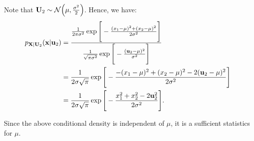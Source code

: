 \begin{example}
\begin{enumerate}[label=(\roman*)]
        \noindent Note that ${\bf U}_2 \sim \mathcal{N}\Big( \mu, \frac{\sigma^2}{2} \Big)$. Hence, we have:
        \begin{align*}
             p_{{\bf X}|{\bf U}_2}({\bf x}|{\bf u}_2) &= \frac{
                \frac{1}{2\pi\sigma^2}\exp\Bigg[ -\frac{(x_1 - \mu)^2 + (x_2 - \mu)^2}{2\sigma^2} \Bigg]
             }{
                \frac{1}{\sqrt{\pi\sigma^2}}\exp\Bigg[ -\frac{({\bf u}_2 - \mu)^2}{\sigma^2} \Bigg]
             } \\
             &= \frac{1}{2\sigma\sqrt{\pi}}\exp\Bigg[ 
                -\frac{-(x_1 - \mu)^2 + (x_2 - \mu)^2 - 2({\bf u}_2 - \mu)^2}{2\sigma^2}
              \Bigg] \\
             &= \frac{1}{2\sigma\sqrt{\pi}} \exp\Bigg[ -\frac{x_1^2 + x_2^2 - 2{\bf u}_2^2}{2\sigma^2} \Bigg].
        \end{align*} 

        \noindent Since the above conditional density is independent of $\mu$, it is a sufficient statistics for $\mu$.
    \end{enumerate} 
\end{example} 

